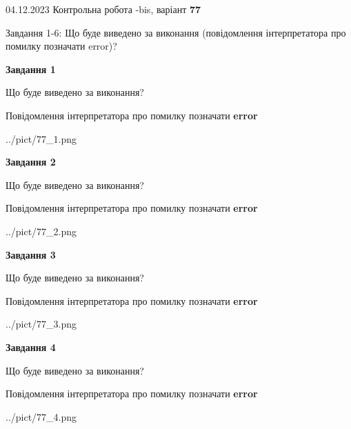 \documentclass[12pt, ukrainian]{article}
\begin{document}
{{04.12.2023 Контрольна робота -bis, варіант  \No \textbf { 77 }\par}}
{

Завдання 1-6: Що буде виведено за виконання (повідомлення інтерпретатора про помилку позначати error)?


{\begin {center}\textbf{Завдання 1}\end {center}}\par
Що буде виведено за виконання? \par
Повідомлення інтерпретатора про помилку позначати \textbf{error}

\begin{center}
	{../pict/77_1.png}
\end{center}
\newpage

{\begin {center}\textbf{Завдання 2}\end {center}}\par
Що буде виведено за виконання? \par
Повідомлення інтерпретатора про помилку позначати \textbf{error}

\begin{center}
	{../pict/77_2.png}
\end{center}
\newpage

{\begin {center}\textbf{Завдання 3}\end {center}}\par
Що буде виведено за виконання? \par
Повідомлення інтерпретатора про помилку позначати \textbf{error}

\begin{center}
	{../pict/77_3.png}
\end{center}
\newpage

{\begin {center}\textbf{Завдання 4}\end {center}}\par
Що буде виведено за виконання? \par
Повідомлення інтерпретатора про помилку позначати \textbf{error}

\begin{center}
	{../pict/77_4.png}
\end{center}
\newpage

}
\end{document}
